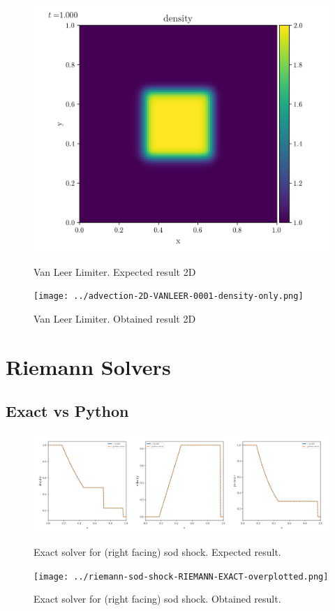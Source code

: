 \begin{figure}[htbp]
    \centering
	\includegraphics[width=.7\textwidth]{./figures/advection-2D-VANLEER-0001-density-only.png}%
	\caption{Van Leer Limiter. Expected result 2D}
	\texttt{[image: ../advection-2D-VANLEER-0001-density-only.png]}%
	\caption{Van Leer Limiter. Obtained result 2D}
\end{figure}













\clearpage
\section{Riemann Solvers}
\subsection{Exact vs Python}


\begin{figure}[htbp]
    \centering
	\includegraphics[width=.9\textwidth]{./figures/riemann-sod-shock-RIEMANN-EXACT-overplotted.png}%
	\caption{Exact solver for (right facing) sod shock. Expected result.}
	\texttt{[image: ../riemann-sod-shock-RIEMANN-EXACT-overplotted.png]}%
	\caption{Exact solver for (right facing) sod shock. Obtained result.}
\end{figure}


